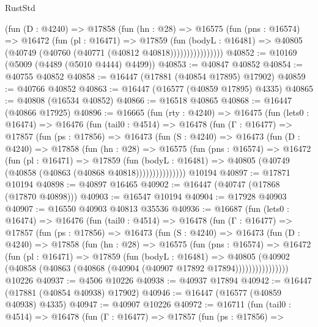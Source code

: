 \begin{lexlean}{RustStd}
\begin{coremodule}
{\begin{coremodule}
{{{{{{{{{{{{{{{{{{{{{{{{{{{{{{{{{{{{{{{{{{{{{{{{{{{{{{{                  (fun (D : @4240) =>
                  @17858
                    (fun (hn : @28) =>
                    @16575
                      (fun (pns : @16574) =>
                      @16472
                        (fun (pl : @16471) =>
                        @17859
                          (fun (bodyL : @16481) =>
                          @40805 (@40749 (@40760 (@40771 (@40812 @40818))))))))))))))))
@40852 := @10169 (@5009 (@4489 (@5010 @4444) @4499))
@40853 := @40847 @40852
@40854 := @40755 @40852
@40858 := @16447 (@17881 (@40854 @17895) @17902)
@40859 := @40766 @40852
@40863 := @16447 (@16577 (@40859 @17895) @4335)
@40865 := @40808 (@16534 @40852)
@40866 := @16518 @40865
@40868 := @16447 (@40866 @17925)
@40896 := @16665
    (fun (rty : @4240) =>
    @16475
      (fun (lets0 : @16474) =>
      @16476
        (fun (tail0 : @4514) =>
        @16478
          (fun (Γ : @16477) =>
          @17857
            (fun (ps : @17856) =>
            @16473
              (fun (S : @4240) =>
              @16473
                (fun (D : @4240) =>
                @17858
                  (fun (hn : @28) =>
                  @16575
                    (fun (pns : @16574) =>
                    @16472
                      (fun (pl : @16471) =>
                      @17859
                        (fun (bodyL : @16481) =>
                        @40805 (@40749 (@40858 (@40863 (@40868 @40818)))))))))))))))
    @10194
@40897 := @17871 @10194
@40898 := @40897 @16465
@40902 := @16447 (@40747 (@17868 (@17870 @40898)))
@40903 := @16547 @10194
@40904 := @17928 @40903
@40907 := @16550 @40903 @40813 @35536
@40936 := @16687
    (fun (lets0 : @16474) =>
    @16476
      (fun (tail0 : @4514) =>
      @16478
        (fun (Γ : @16477) =>
        @17857
          (fun (ps : @17856) =>
          @16473
            (fun (S : @4240) =>
            @16473
              (fun (D : @4240) =>
              @17858
                (fun (hn : @28) =>
                @16575
                  (fun (pns : @16574) =>
                  @16472
                    (fun (pl : @16471) =>
                    @17859
                      (fun (bodyL : @16481) =>
                      @40805
                        (@40902
                          (@40858 (@40863 (@40868 (@40904 (@40907 @17892 @17894))))))))))))))))
    @10226
@40937 := @4506 @10226
@40938 := @40937 @17894
@40942 := @16447 (@17881 (@40854 @40938) @17902)
@40946 := @16447 (@16577 (@40859 @40938) @4335)
@40947 := @40907 @10226
@40972 := @16711
    (fun (tail0 : @4514) =>
    @16478
      (fun (Γ : @16477) =>
      @17857
        (fun (ps : @17856) =>
}}}}}}}}}}}}}}}}}}}}}}}}}}}}}}}}}}}}}}}}}}}}}}}}}}}}}}}
\end{coremodule}}
\end{coremodule}
\end{lexlean}
